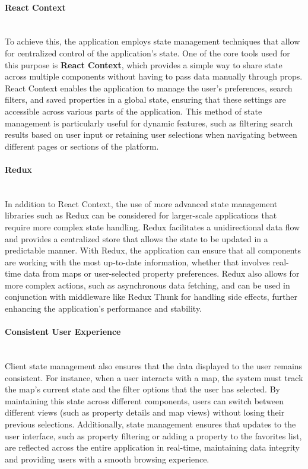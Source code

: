     \paragraph{React Context}\mbox{}\\
    \newline
    To achieve this, the application employs state management techniques that allow for centralized control of the application’s state. One of the core tools used for this purpose is \textbf{React Context}, which provides a simple way to share state across multiple components without having to pass data manually through props. React Context enables the application to manage the user’s preferences, search filters, and saved properties in a global state, ensuring that these settings are accessible across various parts of the application. This method of state management is particularly useful for dynamic features, such as filtering search results based on user input or retaining user selections when navigating between different pages or sections of the platform.
    \paragraph{Redux}\mbox{}\\
    \newline
    In addition to React Context, the use of more advanced state management libraries such as Redux can be considered for larger-scale applications that require more complex state handling. Redux facilitates a unidirectional data flow and provides a centralized store that allows the state to be updated in a predictable manner. With Redux, the application can ensure that all components are working with the most up-to-date information, whether that involves real-time data from maps or user-selected property preferences. Redux also allows for more complex actions, such as asynchronous data fetching, and can be used in conjunction with middleware like Redux Thunk for handling side effects, further enhancing the application’s performance and stability.
    \paragraph{Consistent User Experience}\mbox{}\\
    \newline
    Client state management also ensures that the data displayed to the user remains consistent. For instance, when a user interacts with a map, the system must track the map's current state and the filter options that the user has selected. By maintaining this state across different components, users can switch between different views (such as property details and map views) without losing their previous selections. Additionally, state management ensures that updates to the user interface, such as property filtering or adding a property to the favorites list, are reflected across the entire application in real-time, maintaining data integrity and providing users with a smooth browsing experience.
